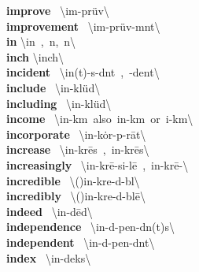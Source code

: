 \documentclass[10pt,a4paper]{article}
\begin{document}
\begin{multicols}{2}
\textbf{ improve }\quad \ \textbackslash im-\textprimstress pr\"{u}v\textbackslash \\
\textbf{ improvement }\quad \ \textbackslash im-\textprimstress pr\"{u}v-m\textschwa nt\textbackslash \\
\textbf{ in }\quad \textbackslash \textprimstress in\ ,\ \textschwa n,\ \textsuperscript{\textreve}n\textbackslash \\
\textbf{ inch }\quad \textbackslash \textprimstress inch\textbackslash \\
\textbf{ incident }\quad \ \textbackslash \textprimstress in(t)-s\textschwa -d\textschwa nt\ ,\ -\textsecstress dent\textbackslash \\
\textbf{ include }\quad \ \textbackslash in-\textprimstress kl\"{u}d\textbackslash \\
\textbf{ including }\quad \ \textbackslash in-\textprimstress kl\"{u}d\textbackslash \\
\textbf{ income }\quad \ \textbackslash \textprimstress in-\textsecstress k\textschwa m\ also\ \textprimstress in-k\textschwa m\ or\ \textprimstress i\engma -k\textschwa m\textbackslash \\
\textbf{ incorporate }\quad \ \textbackslash in-\textprimstress k\.{o}r-p\textschwa -\textsecstress r\={a}t\textbackslash \\
\textbf{ increase }\quad \ \textbackslash in-\textprimstress kr\={e}s\ ,\ \textprimstress in-\textsecstress kr\={e}s\textbackslash \\
\textbf{ increasingly }\quad \ \textbackslash in-\textprimstress kr\={e}-si\engma -l\={e}\ ,\ \textprimstress in-\textsecstress kr\={e}-\textbackslash \\
\textbf{ incredible }\quad \ \textbackslash (\textsecstress )in-\textprimstress kre-d\textschwa -b\textschwa l\textbackslash \\
\textbf{ incredibly }\quad \ \textbackslash (\textsecstress )in-\textprimstress kre-d\textschwa -bl\={e}\textbackslash \\
\textbf{ indeed }\quad \ \textbackslash in-\textprimstress d\={e}d\textbackslash \\
\textbf{ independence }\quad \ \textbackslash \textsecstress in-d\textschwa -\textprimstress pen-d\textschwa n(t)s\textbackslash \\
\textbf{ independent }\quad \ \textbackslash \textsecstress in-d\textschwa -\textprimstress pen-d\textschwa nt\textbackslash \\
\textbf{ index }\quad \ \textbackslash \textprimstress in-\textsecstress deks\textbackslash \\

\end{multicols}
\end{document}
